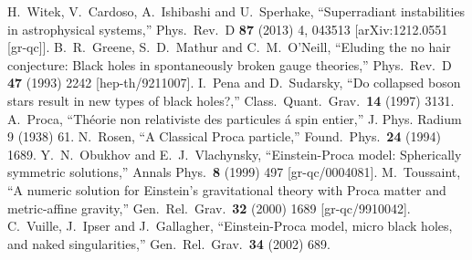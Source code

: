 \documentclass{article}
\numberwithin{equation}{section}
\begin{document}
\begin{small}
\begin{thebibliography}{99}
  H.~Witek, V.~Cardoso, A.~Ishibashi and U.~Sperhake,
  ``Superradiant instabilities in astrophysical systems,''
  Phys.\ Rev.\ D {\bf 87} (2013) 4,  043513
  [arXiv:1212.0551 [gr-qc]].
  B.~R.~Greene, S.~D.~Mathur and C.~M.~O'Neill,
  ``Eluding the no hair conjecture: Black holes in spontaneously broken gauge theories,''
  Phys.\ Rev.\ D {\bf 47} (1993) 2242
  [hep-th/9211007].
  I.~Pena and D.~Sudarsky,
  ``Do collapsed boson stars result in new types of black holes?,''
  Class.\ Quant.\ Grav.\  {\bf 14} (1997) 3131.
A.~Proca,   
``Th\'eorie non relativiste des particules  \'a spin entier,''
J. Phys. Radium 9 (1938) 61.
  N.~Rosen,
  ``A Classical Proca particle,''
  Found.\ Phys.\  {\bf 24} (1994) 1689.
  Y.~N.~Obukhov and E.~J.~Vlachynsky,
  ``Einstein-Proca model: Spherically symmetric solutions,''
  Annals Phys.\  {\bf 8} (1999) 497
  [gr-qc/0004081].
  M.~Toussaint,
  ``A numeric solution for Einstein's gravitational theory with Proca matter and metric-affine gravity,''
  Gen.\ Rel.\ Grav.\  {\bf 32} (2000) 1689
  [gr-qc/9910042].
  C.~Vuille, J.~Ipser and J.~Gallagher,
  ``Einstein-Proca model, micro black holes, and naked singularities,''
  Gen.\ Rel.\ Grav.\  {\bf 34} (2002) 689.

\end{thebibliography}
\end{small}
\end{document}
